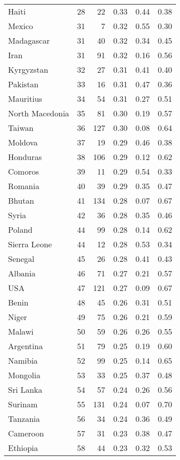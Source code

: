 \begin{longtable}[t]{lrrrrr}
Haiti & 28 & 22 & 0.33 & 0.44 & 0.38\\
Mexico & 31 & 7 & 0.32 & 0.55 & 0.30\\
Madagascar & 31 & 40 & 0.32 & 0.34 & 0.45\\
\addlinespace
Iran & 31 & 91 & 0.32 & 0.16 & 0.56\\
Kyrgyzstan & 32 & 27 & 0.31 & 0.41 & 0.40\\
Pakistan & 33 & 16 & 0.31 & 0.47 & 0.36\\
Mauritius & 34 & 54 & 0.31 & 0.27 & 0.51\\
North Macedonia & 35 & 81 & 0.30 & 0.19 & 0.57\\
\addlinespace
Taiwan & 36 & 127 & 0.30 & 0.08 & 0.64\\
Moldova & 37 & 19 & 0.29 & 0.46 & 0.38\\
Honduras & 38 & 106 & 0.29 & 0.12 & 0.62\\
Comoros & 39 & 11 & 0.29 & 0.54 & 0.33\\
Romania & 40 & 39 & 0.29 & 0.35 & 0.47\\
\addlinespace
Bhutan & 41 & 134 & 0.28 & 0.07 & 0.67\\
Syria & 42 & 36 & 0.28 & 0.35 & 0.46\\
Poland & 44 & 99 & 0.28 & 0.14 & 0.62\\
Sierra Leone & 44 & 12 & 0.28 & 0.53 & 0.34\\
Senegal & 45 & 26 & 0.28 & 0.41 & 0.43\\
\addlinespace
Albania & 46 & 71 & 0.27 & 0.21 & 0.57\\
USA & 47 & 121 & 0.27 & 0.09 & 0.67\\
Benin & 48 & 45 & 0.26 & 0.31 & 0.51\\
Niger & 49 & 75 & 0.26 & 0.21 & 0.59\\
Malawi & 50 & 59 & 0.26 & 0.26 & 0.55\\
\addlinespace
Argentina & 51 & 79 & 0.25 & 0.19 & 0.60\\
Namibia & 52 & 99 & 0.25 & 0.14 & 0.65\\
Mongolia & 53 & 33 & 0.25 & 0.37 & 0.48\\
Sri Lanka & 54 & 57 & 0.24 & 0.26 & 0.56\\
Surinam & 55 & 131 & 0.24 & 0.07 & 0.70\\
\addlinespace
Tanzania & 56 & 34 & 0.24 & 0.36 & 0.49\\
Cameroon & 57 & 31 & 0.23 & 0.38 & 0.47\\
Ethiopia & 58 & 44 & 0.23 & 0.32 & 0.53\\

\end{longtable}
